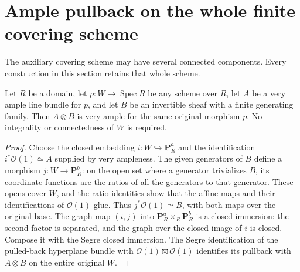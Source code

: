 \section{Ample pullback on the whole finite covering scheme}
\label{sec:kn-nadel-finite-ample}

The auxiliary covering scheme may have several connected components.  Every
construction in this section retains that whole scheme.

\begin{lemma}
\label{lem:kn-nadel-very-ample-generated-arbitrary}
\leanok
Let $R$ be a domain, let $p:W\to\operatorname{Spec}R$ be any scheme over $R$,
let $A$ be a very ample line bundle for $p$, and let $B$ be an invertible
sheaf with a finite generating family.  Then $A\otimes B$ is very ample
for the same original morphism $p$.  No integrality or connectedness of
$W$ is required.
\end{lemma}
\begin{proof}
Choose the closed embedding $i:W\hookrightarrow\mathbf P^a_R$ and the
identification $i^*\mathcal O(1)\simeq A$ supplied by very ampleness.
The given generators of $B$ define a morphism $j:W\to\mathbf P^b_R$:
on the open set where a generator trivializes $B$, its coordinate
functions are the ratios of all the generators to that generator.
These opens cover $W$, and the ratio identities show that the affine
maps and their identifications of $\mathcal O(1)$ glue.  Thus
$j^*\mathcal O(1)\simeq B$, with both maps over the original base.
The graph map $(i,j)$ into
$\mathbf P^a_R\times_R\mathbf P^b_R$ is a closed immersion: the second
factor is separated, and the graph over the closed image of $i$ is
closed.  Compose it with the Segre closed immersion.  The Segre
identification of the pulled-back hyperplane bundle with
$\mathcal O(1)\boxtimes\mathcal O(1)$ identifies its pullback with
$A\otimes B$ on the entire original $W$.
\end{proof}

